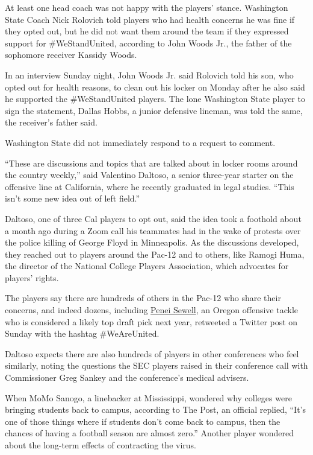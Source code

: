 At least one head coach was not happy with the players' stance.
Washington State Coach Nick Rolovich told players who had health
concerns he was fine if they opted out, but he did not want them around
the team if they expressed support for \#WeStandUnited, according to
John Woods Jr., the father of the sophomore receiver Kassidy Woods.

In an interview Sunday night, John Woods Jr. said Rolovich told his son,
who opted out for health reasons, to clean out his locker on Monday
after he also said he supported the \#WeStandUnited players. The lone
Washington State player to sign the statement, Dallas Hobbs, a junior
defensive lineman, was told the same, the receiver's father said.

Washington State did not immediately respond to a request to comment.

``These are discussions and topics that are talked about in locker rooms
around the country weekly,'' said Valentino Daltoso, a senior three-year
starter on the offensive line at California, where he recently graduated
in legal studies. ``This isn't some new idea out of left field.''

Daltoso, one of three Cal players to opt out, said the idea took a
foothold about a month ago during a Zoom call his teammates had in the
wake of protests over the police killing of George Floyd in Minneapolis.
As the discussions developed, they reached out to players around the
Pac-12 and to others, like Ramogi Huma, the director of the National
College Players Association, which advocates for players' rights.

The players say there are hundreds of others in the Pac-12 who share
their concerns, and indeed dozens, including
\href{https://twitter.com/peneisewell58/status/1289974930155569153}{Penei
Sewell}, an Oregon offensive tackle who is considered a likely top draft
pick next year, retweeted a Twitter post on Sunday with the hashtag
\#WeAreUnited.

Daltoso expects there are also hundreds of players in other conferences
who feel similarly, noting the questions the SEC players raised in their
conference call with Commissioner Greg Sankey and the conference's
medical advisers.

When MoMo Sanogo, a linebacker at Mississippi, wondered why colleges
were bringing students back to campus, according to The Post, an
official replied, ``It's one of those things where if students don't
come back to campus, then the chances of having a football season are
almost zero.'' Another player wondered about the long-term effects of
contracting the virus.

